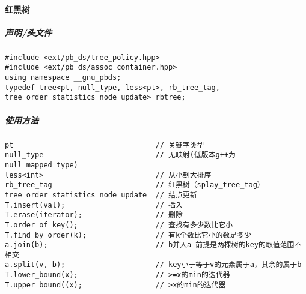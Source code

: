 \paragraph{红黑树}
\subparagraph{声明/头文件}
\begin{lstlisting}
#include <ext/pb_ds/tree_policy.hpp>
#include <ext/pb_ds/assoc_container.hpp>
using namespace __gnu_pbds;
typedef tree<pt, null_type, less<pt>, rb_tree_tag, tree_order_statistics_node_update> rbtree;
\end{lstlisting}
\subparagraph{使用方法}
\begin{lstlisting}
pt                                 // 关键字类型
null_type                          // 无映射(低版本g++为null_mapped_type)
less<int>                          // 从小到大排序
rb_tree_tag                        // 红黑树（splay_tree_tag）
tree_order_statistics_node_update  // 结点更新
T.insert(val);                     // 插入
T.erase(iterator);                 // 删除
T.order_of_key();                  // 查找有多少数比它小
T.find_by_order(k);                // 有k个数比它小的数是多少
a.join(b);                         // b并入a 前提是两棵树的key的取值范围不相交
a.split(v, b);                     // key小于等于v的元素属于a，其余的属于b
T.lower_bound(x);                  // >=x的min的迭代器
T.upper_bound((x);                 // >x的min的迭代器
\end{lstlisting}

